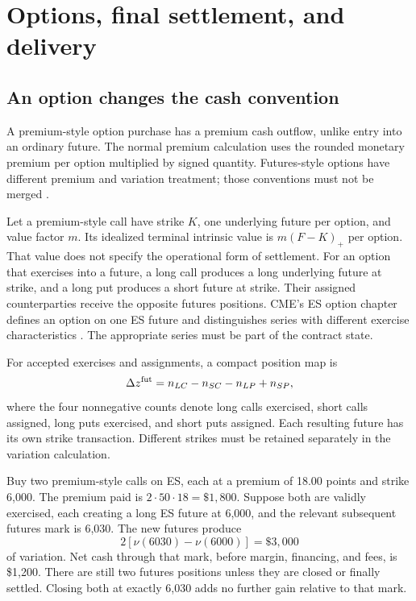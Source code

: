 \section{Options, final settlement, and delivery}
\label{sec:delivery}

\subsection{An option changes the cash convention}

A premium-style option purchase has a premium cash outflow, unlike entry into an ordinary future. The normal premium calculation uses the rounded monetary premium per option multiplied by signed quantity. Futures-style options have different premium and variation treatment; those conventions must not be merged \citep{CMEMoney}.

Let a premium-style call have strike $K$, one underlying future per option, and value factor $m$. Its idealized terminal intrinsic value is $m(F-K)_+$ per option. That value does not specify the operational form of settlement. For an option that exercises into a future, a long call produces a long underlying future at strike, and a long put produces a short future at strike. Their assigned counterparties receive the opposite futures positions. CME's ES option chapter defines an option on one ES future and distinguishes series with different exercise characteristics \citep{CME358A}. The appropriate series must be part of the contract state.

For accepted exercises and assignments, a compact position map is
\begin{equation}
 \Delta z^{\rm fut}=n_{LC}-n_{SC}-n_{LP}+n_{SP},
\end{equation}
where the four nonnegative counts denote long calls exercised, short calls assigned, long puts exercised, and short puts assigned. Each resulting future has its own strike transaction. Different strikes must be retained separately in the variation calculation.

\begin{example}\label{ex:option}
Buy two premium-style calls on ES, each at a premium of 18.00 points and strike 6,000. The premium paid is $2\cdot50\cdot18=\$1,800$. Suppose both are validly exercised, each creating a long ES future at 6,000, and the relevant subsequent futures mark is 6,030. The new futures produce
\begin{equation}
 2[\nu(6030)-\nu(6000)]=\$3,000
\end{equation}
of variation. Net cash through that mark, before margin, financing, and fees, is \$1,200. There are still two futures positions unless they are closed or finally settled. Closing both at exactly 6,030 adds no further gain relative to that mark.
\end{example}

